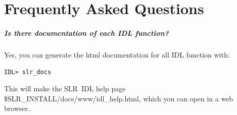 \documentclass{report}
\newcommand{\slr}{SLR}
\begin{document}
\chapter{Frequently Asked Questions}


\paragraph{Is there documentation of each IDL function?}

Yes, you can generate the html documentation for all IDL function
with:
\begin{verbatim}
IDL> slr_docs
\end{verbatim}
This will make the \slr\ IDL help page
\$SLR\_INSTALL/docs/www/idl\_help.html, which you can open in a web
browser.







\end{document}
